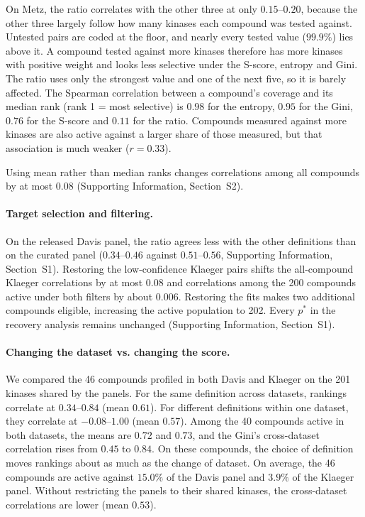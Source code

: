 On Metz, the ratio correlates with the other three at only
$0.15$--$0.20$, because the other three largely follow how many kinases each
compound was tested against. Untested pairs are coded at the floor, and nearly
every tested value ($99.9\%$) lies above it. A compound tested against more
kinases therefore has more kinases with positive weight and looks less
selective under the S-score, entropy and Gini. The ratio uses only the
strongest value and one of the next five, so it is barely affected. The
Spearman correlation between a compound's coverage and its median rank (rank 1
= most selective) is $0.98$ for the entropy, $0.95$ for the Gini, $0.76$ for
the S-score and $0.11$ for the ratio. Compounds measured against more kinases
are also active against a larger share of those measured, but that association
is much weaker ($r = 0.33$).

Using mean rather than median ranks changes correlations among all compounds
by at most $0.08$ (Supporting Information, Section~S2).

\paragraph{Target selection and filtering.} On the released Davis panel, the
ratio agrees less with the other definitions than on the curated panel
($0.34$--$0.46$ against $0.51$--$0.56$, Supporting Information,
Section~S1). Restoring the low-confidence Klaeger pairs shifts the
all-compound Klaeger correlations by at most $0.08$ and correlations among
the 200 compounds active under both filters by about $0.006$. Restoring the
fits makes two additional compounds eligible, increasing the active population
to 202. Every $p^*$ in the recovery analysis remains unchanged (Supporting
Information, Section~S1).

\paragraph{Changing the dataset vs. changing the score.}
We compared the 46 compounds profiled in both Davis and Klaeger on the 201
kinases shared by the panels. For the same definition across datasets,
rankings correlate at $0.34$--$0.84$ (mean $0.61$). For different definitions
within one dataset, they correlate at $-0.08$--$1.00$ (mean $0.57$).
Among the 40 compounds active in both datasets, the means are $0.72$
and $0.73$, and the Gini's cross-dataset correlation rises from $0.45$ to
$0.84$. On these compounds, the choice of definition moves rankings about as
much as the change of dataset. On average, the 46 compounds are active
against $15.0\%$ of the Davis panel and $3.9\%$ of the Klaeger panel. Without
restricting the panels to their shared kinases, the cross-dataset
correlations are lower (mean $0.53$).

